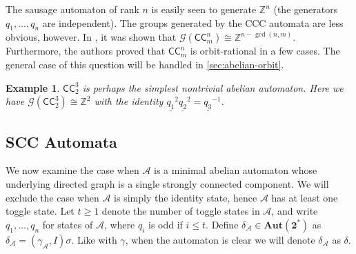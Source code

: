 \documentclass[12pt, letterpaper]{article}
\newcommand{\Z}{\mathbb Z}
\newcommand{\bin}{\mathbf 2}
\newcommand{\A}{\mathcal A}
\newcommand{\CC}{\mathsf{CC}}
\newcommand{\Aut}{\mathbf{Aut}}
\newcommand{\gp}{\mathcal G}
\newtheorem{example}[thm]{Example}
\begin{document}
The sausage automaton of rank $n$ is easily seen to generate $\Z^n$ (the
generators $q_1, \ldots, q_n$ are independent).  The groups generated by
the CCC automata are less obvious, however. In \cite{jalc170214}, it was shown
that $\gp(\CC^n_m) \cong \Z^{n - \gcd(n, m)}$. Furthermore, the authors proved
that $\CC^n_m$ is orbit-rational in a few cases. The general case of this
question will be handled in \cref{sec:abelian-orbit}.

\begin{example}
    $\CC^3_2$ is perhaps the simplest nontrivial abelian automaton. Here we
    have $\gp(\CC^3_2) \cong \Z^2$ with the identity
    $\underline{q_1}^2 \underline{q_2}^2 = \underline{q_3}^{-1}$.
\end{example}

\subsection{SCC Automata}
We now examine the case when $\A$ is a minimal abelian automaton whose
underlying directed graph is a single strongly connected component. We will
exclude the case when $\A$ is simply the identity state, hence $\A$ has at
least one toggle state. Let $t \ge 1$ denote the number of toggle states in
$\A$, and write $q_1, \ldots, q_n$ for states of $\A$, where $q_i$ is odd if $i
\le t$. Define $\delta_\A \in \Aut(\bin^*)$ as $\delta_\A = (\gamma_\A,
I)\sigma$.  Like with $\gamma$, when the automaton is clear we will denote
$\delta_\A$ as $\delta$.
\end{document}

